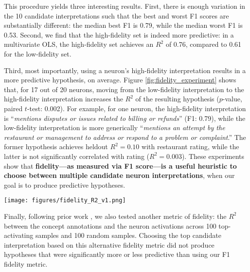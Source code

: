 This procedure yields three interesting results. 
First, there is enough variation in the 10 candidate interpretations such that the best and worst F1 scores are substantially different: the median best F1 is 0.79, while the median worst F1 is 0.53.
Second, we find that the high-fidelity set is indeed more predictive: in a multivariate OLS, the high-fidelity set achieves an $R^2$ of 0.76, compared to 0.61 for the low-fidelity set.

Third, most importantly, using a neuron's high-fidelity interpretation results in a more predictive hypothesis, on average.
Figure \ref{fig:fidelity_experiment} shows that, for 17 out of 20 neurons, moving from the low-fidelity interpretation to the high-fidelity interpretation increases the $R^2$ of the resulting hypothesis ($p$-value, paired $t$-test: 0.002).
For example, for one neuron, the high-fidelity interpretation is ``\textit{mentions disputes or issues related to billing or refunds}'' (F1: 0.79), while the low-fidelity interpretation is more generically ``\textit{mentions an attempt by the restaurant or management to address or respond to a problem or complaint}.'' 
The former hypothesis achieves heldout $R^2 = 0.10$ with restaurant rating, while the latter is not significantly correlated with rating ($R^2 = 0.003$).
These experiments show that \textbf{fidelity—as measured via F1 score—is a useful heuristic to choose between multiple candidate neuron interpretations}, when our goal is to produce predictive hypotheses.

\begin{figure*}[!h]
\begin{center}
    \texttt{[image: figures/fidelity\_R2\_v1.png]}
\end{center}
    \caption{For 17 of the top 20 neurons on \yelp, a higher-fidelity neuron interpretation results in a more predictive hypothesis. 
    Fidelity is measured by the F1 score between the concept annotations and the neuron activations on a sample of 100 highly-activating and 100 weakly-activating examples.
    We generate 10 candidate interpretations for each neuron, and compare the interpretations with best- and worst-F1.
    Predictiveness is measured by computing the $R^2$ between the concept annotations and $Y$ (restaurant rating) for 10K heldout examples.
    }
    \label{fig:fidelity_experiment}
\end{figure*}

Finally, following prior work \citep{bills2023language}, we also tested another metric of fidelity: the $R^2$ between the concept annotations and the neuron activations across 100 top-activating samples and 100 random samples. 
Choosing the top candidate interpretation based on this alternative fidelity metric did not produce hypotheses that were significantly more or less predictive than using our F1 fidelity metric. 

